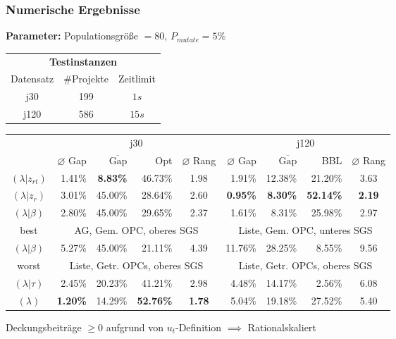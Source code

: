 \begin{frame}[t]
\frametitle{Numerische Ergebnisse}
\begin{footnotesize}
\textbf{Parameter:} Populationsgröße $=80$, $P_{mutate}=5\%$\\

\begin{center}
	\begin{tabular}{ccc}
		\multicolumn{3}{c}{\textbf{Testinstanzen}}\\
		Datensatz & \#Projekte & Zeitlimit\\
		j30 & 199 & $1s$\\
		j120 & 586 & $15s$
	\end{tabular}
\end{center}

\begin{center}	
\tabcolsep=0.16cm
\begin{tabular}{|c|rrrc|rrrc|}
	\hline
	& \multicolumn{4}{c|}{j30} & \multicolumn{4}{c|}{j120}\\
	 & $\varnothing$ Gap & $\overline{\mbox{Gap}}$ & Opt & $\varnothing$ Rang & $\varnothing$ Gap & $\overline{\mbox{Gap}}$ & BBL & $\varnothing$ Rang \\[3pt]
	\hline
   $(\lambda|z_{rt})$&1.41\%&\textbf{8.83\%}&46.73\%&1.98&1.91\%&12.38\%&21.20\%&3.63\\
	\hline
   $(\lambda|z_r)$&3.01\%&45.00\%&28.64\%&2.60&\textbf{0.95\%}&\textbf{8.30\%}&\textbf{52.14\%}&\textbf{2.19}\\
	\hline
	$(\lambda|\beta)$&2.80\%&45.00\%&29.65\%&2.37&1.61\%&8.31\%&25.98\%&2.97\\
	best & \multicolumn{4}{c|}{AG, Gem. OPC, oberes SGS} & \multicolumn{4}{c|}{Liste, Gem. OPC, unteres SGS}\\
	\hline
	$(\lambda|\beta)$&5.27\%&45.00\%&21.11\%&4.39&11.76\%&28.25\%&8.55\%&9.56\\
	worst & \multicolumn{4}{c|}{Liste, Getr. OPCs, oberes SGS} & \multicolumn{4}{c|}{Liste, Getr. OPCs, oberes SGS}\\
	\hline
	$(\lambda|\tau)$&2.45\%&20.23\%&41.21\%&2.98&4.48\%&14.17\%&2.56\%&6.08\\
	\hline
	$(\lambda)$& \textbf{1.20\%}&14.29\%&\textbf{52.76\%}&\textbf{1.78}&5.04\%&19.18\%&27.52\%&5.40\\
	\hline
\end{tabular}
\end{center}

Deckungsbeiträge $\geq 0$ aufgrund von $u_t$-Definition $\implies$ Rationalskaliert

\end{footnotesize}	

\end{frame}

